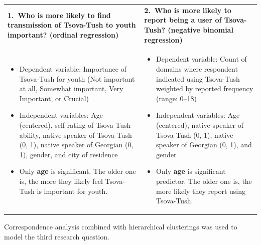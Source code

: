 \documentclass[portrait,fontscale=0.285,a0paper]{baposter2}
\newcommand{\compresslist}{ %
\setlength{\itemsep}{1pt}
\setlength{\parskip}{0pt}
\setlength{\parsep}{0pt}
}
\begin{document}
\begin{poster}
{{\footnotesize
\vspace{0.1in}\begin{tabular}{p{}p{}}
\textbf{1.~Who is more likely to find transmission of Tsova-Tush to youth important? (ordinal regression)} &\textbf{2.~Who is more likely to report being a user of Tsova-Tush? (negative binomial regression)}\\
\vspace{-0.1in}\begin{itemize}[leftmargin=*,rightmargin=0.1in]\compresslist
\item Dependent variable: Importance of Tsova-Tush for youth (Not important at all, Somewhat important, Very Important, or Crucial)
\item Independent variables: Age (centered), self rating of Tsova-Tush ability, native speaker of Tsova-Tush (0, 1), native speaker of Georgian (0, 1), gender, and city of residence
\item Only \textbf{age} is significant. The older one is, the more they likely feel Tsova-Tush is important for youth.
\end{itemize}&

\begin{itemize}[leftmargin=*,rightmargin=0.1in]\compresslist
\item \vspace{-0.1in}Dependent variable: Count of domains where respondent indicated using Tsova-Tush weighted by reported frequency (range: 0--18)
\item Independent variables: Age (centered), native speaker of Tsova-Tush (0, 1), native speaker of Georgian (0, 1), and gender
\item Only \textbf{age} is significant predictor. The older one is, the more likely they report using Tsova-Tush.
\end{itemize}\\
\end{tabular}
}



{\footnotesize Correspondence analysis combined with hierarchical clusterings was used to model the third research question.\\

}}
\end{poster}
\end{document}
